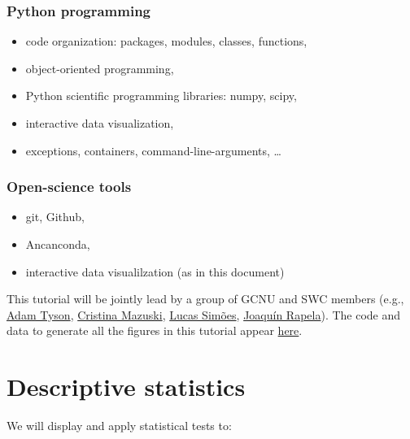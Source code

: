 \documentclass[10pt]{article}
\begin{document}
\subsubsection*{Python programming}

        \begin{itemize}
            \item code organization: packages, modules, classes, functions,
            \item object-oriented programming,
            \item Python scientific programming libraries: numpy, scipy,
            \item interactive data visualization,
            \item exceptions, containers, command-line-arguments, \ldots
        \end{itemize}

\subsubsection*{Open-science tools}

        \begin{itemize}
            \item git, Github,
            \item Ancanconda,
            \item interactive data visualilzation (as in this document)
        \end{itemize}

\vspace{0.5in}

This tutorial will be jointly lead by a group of GCNU and SWC members (e.g.,
\href{https://www.sainsburywellcome.org/web/people/adam-tyson}{Adam Tyson},
\href{https://www.sainsburywellcome.org/web/people/cristina-mazuski}{Cristina
Mazuski}, \href{http://www.gatsby.ucl.ac.uk/~lucass/}{Lucas Sim\~{o}es},
\href{http://www.gatsby.ucl.ac.uk/~rapela/index.html}{Joaqu\'{i}n Rapela}).
%
The code and data to generate all the figures in this tutorial appear
\href{https://github.com/joacorapela/singleNeuronSpikesAnalysisTutorial}{here}.

\section{Descriptive statistics}
\label{sec:descriptive_statistics}

We will display and apply statistical tests to:
\end{document}
